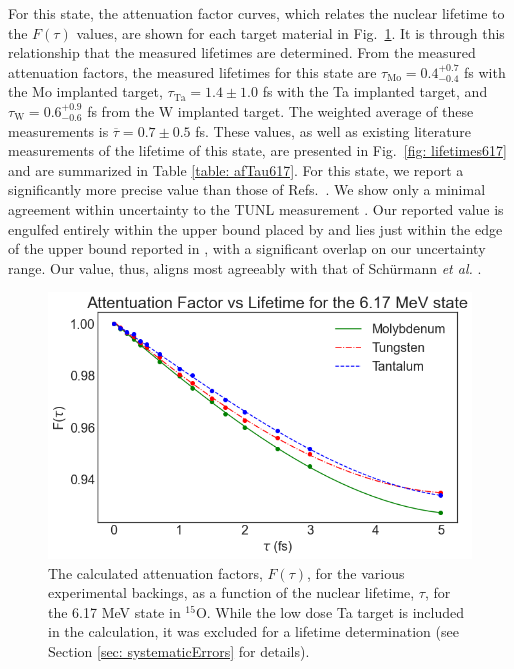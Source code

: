 For this state, the attenuation factor curves, which relates the nuclear lifetime to the $F(\tau)$ values, are shown for each target material in Fig.\ \ref{fig: attFacs617}. It is through this relationship that the measured lifetimes are determined. From the measured attenuation factors, the measured lifetimes for this state are $\tau_{\text{Mo}} = 0.4^{+0.7}_{-0.4}$ fs with the Mo implanted target, $\tau_{\text{Ta}} = 1.4 \pm 1.0$ fs with the Ta implanted target, and $\tau_{\text{W}} = 0.6^{+0.9}_{-0.6}$ fs from the W implanted target. The weighted average of these measurements is $\overline{\tau} = 0.7 \pm 0.5$ fs. These values, as well as existing literature measurements of the lifetime of this state, are presented in Fig.\ \ref{fig: lifetimes617} and are summarized in Table \ref{table: afTau617}. For this state, we report a significantly more precise value than those of Refs.\ \cite{Bertone2001, Schurmann2008, Galinski2014}. We show only a minimal agreement within uncertainty to the TUNL measurement \cite{Bertone2001}. Our reported value is engulfed entirely within the upper bound placed by \cite{Galinski2014} and lies just within the edge of the upper bound reported in \cite{Schurmann2008}, with a significant overlap on our uncertainty range. Our value, thus, aligns most agreeably with that of Sch{\"u}rmann \textit{et al.} \cite{Schurmann2008}.


\begin{figure}
\centering
\includegraphics[width=\linewidth]{figures/attFac617.png}
\caption{The calculated attenuation factors, $F(\tau)$, for the various experimental backings, as a function of the nuclear lifetime, $\tau$, for the 6.17 MeV state in $^{15}$O. While the low dose Ta target is included in the calculation, it was excluded for a lifetime determination (see Section \ref{sec: systematicErrors} for details).}
\label{fig: attFacs617}
\end{figure}


